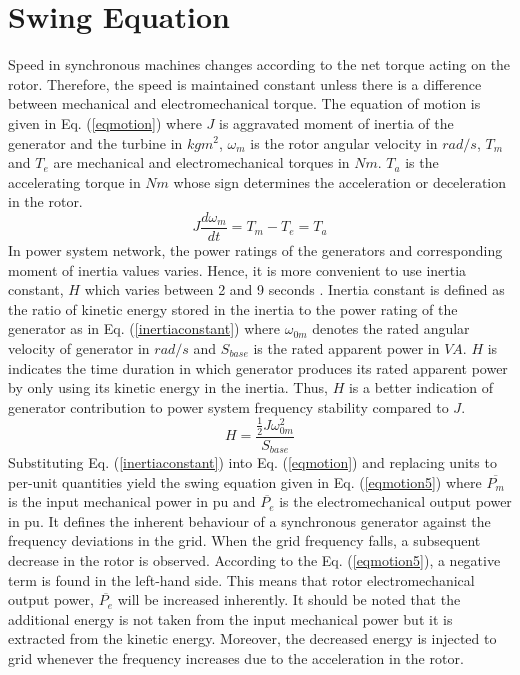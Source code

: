 \section{Swing Equation}
\label{swing}
Speed in synchronous machines changes according to the net torque acting on the rotor. Therefore, the speed is maintained constant unless there is a difference between mechanical and electromechanical torque. The equation of motion is given in Eq. (\ref{eqmotion}) where $J$ is aggravated moment of inertia of the generator and the turbine in $kgm^{2}$, $\omega_{m}$ is the rotor angular velocity in $rad/s$, $T_{m}$ and $T_{e}$ are mechanical and electromechanical torques in $Nm$. $T_{a}$ is the accelerating torque in $Nm$ whose sign determines the acceleration or deceleration in the rotor.
\begin{equation}
J\frac{d\omega_{m}}{dt}=T_{m}-T_{e}=T_{a}
\label{eqmotion}
\end{equation}
In power system network, the power ratings of the generators and corresponding moment of inertia values varies. Hence, it is more convenient to use inertia constant, $H$ which varies between 2 and 9 seconds \cite{Kundur}. Inertia constant is defined as the ratio of kinetic energy stored in the inertia to the power rating of the generator as in Eq. (\ref{inertiaconstant}) where $\omega_{0m}$ denotes the rated angular velocity of generator in $rad/s$ and $S_{base}$ is the rated apparent power in $VA$. $H$ is indicates the time duration in which generator produces its rated apparent power by only using its kinetic energy in the inertia. Thus, $H$ is a better indication of generator contribution to power system frequency stability compared to $J$.
\begin{equation}
H=\frac{{\frac{1}{2}}J\omega_{0m}^{2}}{S_{base}}
\label{inertiaconstant}
\end{equation}
Substituting Eq. (\ref{inertiaconstant}) into Eq. (\ref{eqmotion}) and replacing units to per-unit quantities yield the swing equation given in Eq. (\ref{eqmotion5}) where $\overline{P_{m}}$ is the input mechanical power in pu and $\overline{P_{e}}$ is the electromechanical output power in pu. It defines the inherent behaviour of a synchronous generator against the frequency deviations in the grid. When the grid frequency falls, a subsequent decrease in the rotor is observed. According to the Eq. (\ref{eqmotion5}), a negative term is found in the left-hand side. This means that rotor electromechanical output power, $\overline{P_{e}}$ will be increased inherently. It should be noted that the additional energy is not taken from the input mechanical power but it is extracted from the kinetic energy. Moreover, the decreased energy is injected to grid whenever the frequency increases due to the acceleration in the rotor.
